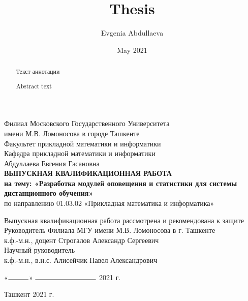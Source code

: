 \documentclass[12pt, a4paper, oneside]{article}
\title{Thesis}
\author{Evgenia Abdullaeva}
\date{May 2021}
\begin{document}
\begin{titlepage}
    \begin{center}
        Филиал Московского Государственного Университета\\
        имени М.В. Ломоносова в городе Ташкенте\\
        \vspace{0.5cm}
        Факультет прикладной математики и информатики\\
        Кафедра прикладной математики и информатики\\
        \vfill
        Абдуллаева Евгения Гасановна\\
        \vfill
        \textbf{ВЫПУСКНАЯ КВАЛИФИКАЦИОННАЯ РАБОТА\\
        на тему: «Разработка модулей оповещения и статистики для системы дистанционного обучения»}\\
        \vspace{0.5cm}
        по направлению 01.03.02 «Прикладная математика и информатика»
    \end{center}
    \vfill
    \begin{flushleft}
        Выпускная квалификационная работа рассмотрена и рекомендована к защите\\
        \vspace{0.5cm}
        Руководитель Филиала МГУ имени М.В. Ломоносова в г. Ташкенте\\
        к.ф.-м.н., доцент Строгалов Александр Сергеевич\\
        \vspace{0.5cm}
        Научный руководитель\\
        к.ф.-м.н., в.н.с. Алисейчик Павел Александрович
    \end{flushleft}
    \vfill
    \begin{flushright}
        «$\rule{1cm}{0.15mm}$» $\rule{3cm}{0.15mm}$ 2021 г.
    \end{flushright}
    \vfill
    \begin{center}
        Ташкент 2021 г.
    \end{center}
\end{titlepage}

\begin{abstract}
Текст аннотации
\end{abstract}
\begin{abstract}
    Abstract text
\end{abstract}
\setcounter{page}{2}
\newpage
\end{document}
